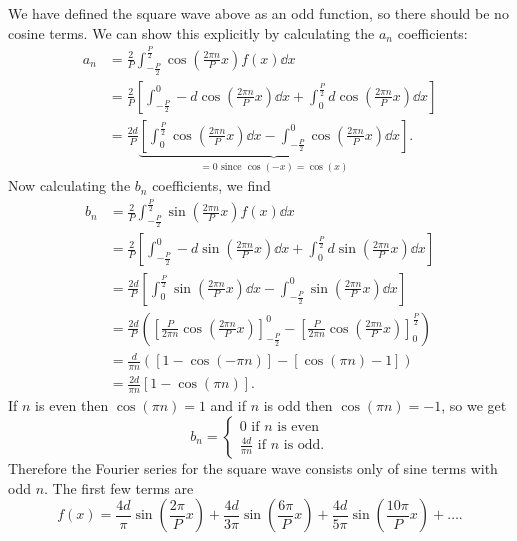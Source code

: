 \documentclass[../classical_mechanics.tex]{subfiles}
\begin{document}
\begin{example}
            We have defined the square wave above as an odd function, so there should be no cosine terms.
            We can show this explicitly by calculating the $a_n$ coefficients:
            \begin{align}
                a_n&=\frac{2}{P}\int_{-\frac{P}{2}}^{\frac{P}{2}}\cos\left(\frac{2\pi n}{P}x\right)f(x)\dd{x}\\
                &=\frac{2}{P}\left[\int_{-\frac{P}{2}}^0 -d\cos\left(\frac{2\pi n}{P}x\right)\dd{x}+\int_0^{\frac{P}{2}}d\cos\left(\frac{2\pi n}{P}x\right)\dd{x}\right]\\
                &=\frac{2d}{P}\underbrace{\left[\int_0^{\frac{P}{2}}\cos\left(\frac{2\pi n}{P}x\right)\dd{x}-\int_{-\frac{P}{2}}^0\cos\left(\frac{2\pi n}{P}x\right)\dd{x}\right]}_{=0\text{ since }\cos(-x)=\cos(x)}.
            \end{align}
            Now calculating the $b_n$ coefficients, we find
            \begin{align}
                b_n&=\frac{2}{P}\int_{-\frac{P}{2}}^{\frac{P}{2}}\sin\left(\frac{2\pi n}{P}x\right)f(x)\dd{x}\\
                &=\frac{2}{P}\left[\int_{-\frac{P}{2}}^0 -d\sin\left(\frac{2\pi n}{P}x\right)\dd{x}+\int_0^{\frac{P}{2}}d\sin\left(\frac{2\pi n}{P}x\right)\dd{x}\right]\\
                &=\frac{2d}{P}\left[\int_0^{\frac{P}{2}}\sin\left(\frac{2\pi n}{P}x\right)\dd{x}-\int_{-\frac{P}{2}}^0\sin\left(\frac{2\pi n}{P}x\right)\dd{x}\right]\\
                &=\frac{2d}{P}\left(\left[\frac{P}{2\pi n}\cos\left(\frac{2\pi n}{P}x\right)\right]_{-\frac{P}{2}}^0-\left[\frac{P}{2\pi n}\cos\left(\frac{2\pi n}{P}x\right)\right]_0^{\frac{P}{2}}\right)\\
                &=\frac{d}{\pi n}([1-\cos(-\pi n)]-[\cos(\pi n)-1])\\
                &=\frac{2d}{\pi n}[1-\cos(\pi n)].
            \end{align}
            If $n$ is even then $\cos(\pi n)=1$ and if $n$ is odd then $\cos(\pi n)=-1$, so we get
            \begin{equation}
                b_n=\begin{cases}
                    0\text{ if $n$ is even}\\
                    \frac{4d}{\pi n}\text{ if $n$ is odd.}
                \end{cases}
            \end{equation}
            Therefore the Fourier series for the square wave consists only of sine terms with odd $n$.
            The first few terms are
            \begin{equation}
                f(x)=\frac{4d}{\pi}\sin\left(\frac{2\pi}{P}x\right)+\frac{4d}{3\pi}\sin\left(\frac{6\pi}{P}x\right)+\frac{4d}{5\pi}\sin\left(\frac{10\pi}{P}x\right)+\dots.
            \end{equation}
        \end{example}
\end{document}
